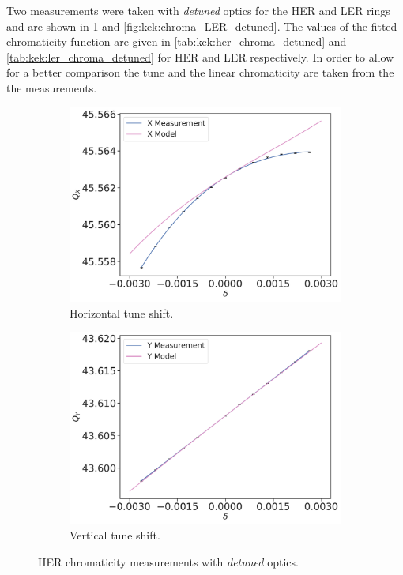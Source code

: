 Two measurements were taken with \textit{detuned} optics for the HER and LER rings and are shown 
in \cref{fig:kek:chroma_HER_detuned} and \cref{fig:kek:chroma_LER_detuned}. The values of the fitted
chromaticity function are given in \cref{tab:kek:her_chroma_detuned} and
\cref{tab:kek:ler_chroma_detuned} for HER and LER respectively. In order to allow for a better
comparison the tune and the linear chromaticity are taken from the the measurements.

\begin{figure}[!htb]
    \centering
    \begin{subfigure}[b]{0.49\textwidth}
        \includegraphics[width=\linewidth]{images/kek/chromaticity/HER_09/qx_modelq0q1.pdf}
        \caption{Horizontal tune shift.}
    \end{subfigure}
    \begin{subfigure}[b]{0.49\textwidth}
        \includegraphics[width=\linewidth]{images/kek/chromaticity/HER_09/qy_modelq0q1.pdf}
        \caption{Vertical tune shift.}
    \end{subfigure}
    \caption{HER chromaticity measurements with \textit{detuned} optics.}
    \label{fig:kek:chroma_HER_detuned}
\end{figure}

